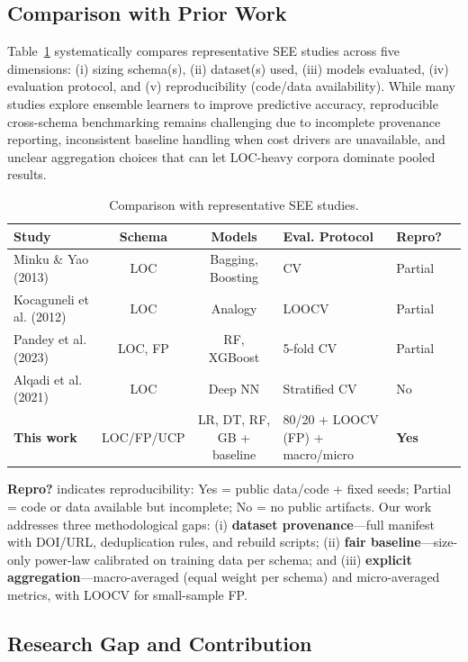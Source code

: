 \documentclass[11pt,a4paper]{article}
\begin{document}
\subsection{Comparison with Prior Work}

Table~\ref{tab:prior-comparison} systematically compares representative SEE studies across five dimensions: (i) sizing schema(s), (ii) dataset(s) used, (iii) models evaluated, (iv) evaluation protocol, and (v) reproducibility (code/data availability). While many studies explore ensemble learners to improve predictive accuracy, reproducible cross-schema benchmarking remains challenging due to incomplete provenance reporting, inconsistent baseline handling when cost drivers are unavailable, and unclear aggregation choices that can let LOC-heavy corpora dominate pooled results.

\begin{table}[h]
\centering
\caption{Comparison with representative SEE studies.}
\label{tab:prior-comparison}
\small
\begin{tabular}{p{3.5cm}ccp{3cm}p{2.5cm}c}
\toprule
Study & Schema & Models & Eval. Protocol & Repro?\\
\midrule
Minku \& Yao (2013) & LOC & Bagging, Boosting & CV & Partial\\
Kocaguneli et al. (2012) & LOC & Analogy & LOOCV & Partial\\
Pandey et al. (2023) & LOC, FP & RF, XGBoost & 5-fold CV & Partial\\
Alqadi et al. (2021) & LOC & Deep NN & Stratified CV & No\\
\textbf{This work} & LOC/FP/UCP & LR, DT, RF, GB + baseline & 80/20 + LOOCV (FP) + macro/micro & \textbf{Yes}\\
\bottomrule
\end{tabular}
\end{table}

\noindent \textbf{Repro?} indicates reproducibility: Yes = public data/code + fixed seeds; Partial = code or data available but incomplete; No = no public artifacts. Our work addresses three methodological gaps: (i) \textbf{dataset provenance}—full manifest with DOI/URL, deduplication rules, and rebuild scripts; (ii) \textbf{fair baseline}—size-only power-law calibrated on training data per schema; and (iii) \textbf{explicit aggregation}—macro-averaged (equal weight per schema) and micro-averaged metrics, with LOOCV for small-sample FP.

\subsection{Research Gap and Contribution}
\end{document}
